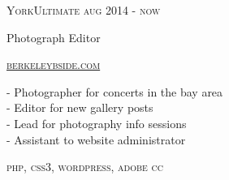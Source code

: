 {
    \textsc{\small{YorkUltimate
            \hfill
            {\raggedleft
                aug 2014 - now
            }
        }
    }

    {\raggedright\large {
        Photograph Editor
    } \\}

    \textsc{\small\href{http://www.berkeleybside.com}{berkeleybside.com}}

    \normalsize{
        - Photographer for concerts in the bay area\\
        - Editor for new gallery posts \\
        - Lead for photography info sessions\\
        - Assistant to website administrator
    }

    \textsc{\small{\color{highlight}
        php,
        css3,
        wordpress,
        adobe cc
    }}
}
